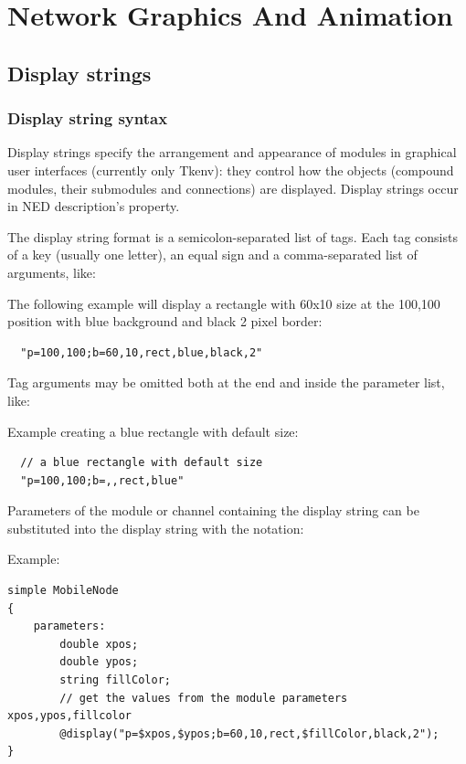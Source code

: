 \chapter{Network Graphics And Animation}
\label{cha:graphics}

\section{Display strings}
\label{sec:ch-graphics:display-strings}

\subsection{Display string syntax}

Display strings specify the arrangement and
appearance of modules in graphical user interfaces (currently only
Tkenv): they control how the objects (compound modules, their
submodules and connections) are displayed. Display strings occur in
NED description's 
property.

The display string format is a semicolon-separated list of tags.
Each tag consists of a key (usually one letter), an equal sign
and a comma-separated list of arguments, like:

The following example will display a rectangle with 60x10 size 
at the 100,100 position with blue background and black 2 pixel border:
\begin{verbatim}
  "p=100,100;b=60,10,rect,blue,black,2"
\end{verbatim}

Tag arguments may be omitted both at the end and inside the
parameter list, like:

Example creating a blue rectangle with default size:
\begin{verbatim}
  // a blue rectangle with default size
  "p=100,100;b=,,rect,blue"
\end{verbatim}

Parameters of the module or channel containing the
display string can be substituted into the display string 
with the  notation:

Example:
\begin{verbatim}
simple MobileNode 
{
    parameters:
        double xpos;
        double ypos;
        string fillColor;
        // get the values from the module parameters xpos,ypos,fillcolor
        @display("p=$xpos,$ypos;b=60,10,rect,$fillColor,black,2");
}
\end{verbatim}

